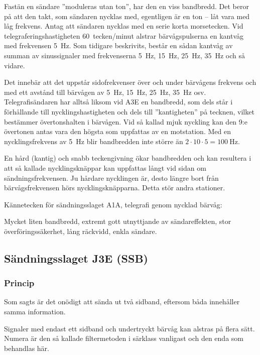 Fastän en sändare ''moduleras utan ton'', har den en viss bandbredd.
Det beror på att den takt, som sändaren nycklas med, egentligen är en ton --
låt vara med låg frekvens.
Antag att sändaren nycklas med en serie korta morsetecken.
Vid telegraferingshastigheten 60~tecken/minut alstrar bärvågspulserna en kantvåg
med frekvensen \SI{5}{\hertz}.
Som tidigare beskrivits, består en sådan kantvåg av summan av sinussignaler med
frekvenserna \SI{5}{\hertz}, \SI{15}{\hertz}, \SI{25}{\hertz}, \SI{35}{\hertz}
och så vidare.

Det innebär att det uppstår sidofrekvenser över och under bärvågens frekvens och
med ett avstånd till bärvågen av \SI{5}{\hertz}, \SI{15}{\hertz},
\SI{25}{\hertz}, \SI{35}{\hertz} osv.
Telegrafisändaren har alltså liksom vid A3E en bandbredd, som dels står i
förhållande till nycklingshastigheten och dels till ''kantigheten'' på tecknen,
vilket bestämmer övertonshalten i bärvågen.
Vid så kallad mjuk nyckling kan den 9:e övertonen antas vara den högsta som
uppfattas av en motstation.
Med en nycklingsfrekvens av \SI{5}{\hertz} blir bandbredden inte större än
\(2 \cdot 10 \cdot 5 = \SI{100}{\hertz}\).

En hård (kantig) och snabb teckengivning ökar bandbredden och kan resultera i
att så kallade nycklingsknäppar kan uppfattas långt vid sidan om
sändningsfrekvensen.
Ju hårdare nycklingen är, desto längre bort från bärvågsfrekvensen hörs
nycklingsknäpparna.
Detta stör andra stationer.

Kännetecken för sändningsslaget A1A, telegrafi genom nycklad bärvåg:

Mycket liten bandbredd, extremt gott utnyttjande av sändareffekten, stor
överföringssäkerhet, lång räckvidd, enkla sändare.

\subsection{Sändningsslaget J3E (SSB)}
\label{modulation_ssb}

\subsubsection{Princip}

Som sagts är det onödigt att sända ut två sidband, eftersom båda innehåller samma
information.

Signaler med endast ett sidband och undertryckt bärvåg kan alstras på flera
sätt.
Numera är den så kallade filtermetoden i särklass vanligast och den enda som
behandlas här.

